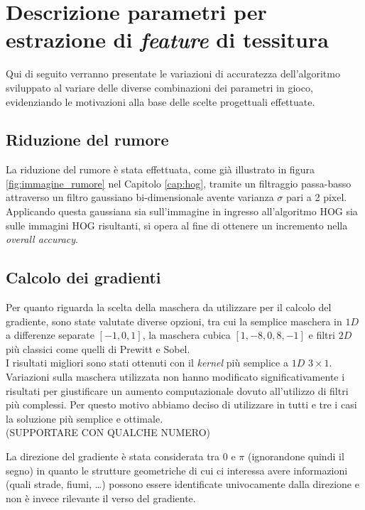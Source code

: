 %

\section{Descrizione parametri per estrazione di \emph{feature} di tessitura}
Qui di seguito verranno presentate le variazioni di accuratezza dell'algoritmo sviluppato al variare delle diverse combinazioni dei parametri in gioco, evidenziando le motivazioni alla base delle scelte progettuali effettuate.

\subsection{Riduzione del rumore}
La riduzione del rumore è stata effettuata, come già illustrato in figura \ref{fig:immagine_rumore} nel Capitolo \ref{cap:hog}, tramite un filtraggio passa-basso attraverso un filtro gaussiano bi-dimensionale avente varianza $\sigma$ pari a 2 pixel. Applicando questa gaussiana sia sull'immagine in ingresso all'algoritmo HOG sia sulle immagini HOG risultanti, si opera al fine di ottenere un incremento nella \emph{overall accuracy}.

\subsection{Calcolo dei gradienti}
Per quanto riguarda la scelta della maschera da utilizzare per il calcolo del gradiente, sono state valutate diverse opzioni, tra cui la semplice maschera in $1D$ a differenze separate $[-1, 0 ,1]$, la maschera cubica $[1,-8,0,8,-1]$ e filtri  $2D$ più classici come quelli di Prewitt e Sobel.\\
I risultati migliori sono stati ottenuti con il \emph{kernel} più semplice a $1D$ $3\times1$. Variazioni sulla maschera utilizzata non hanno modificato significativamente i risultati per giustificare un aumento computazionale dovuto all'utilizzo di filtri più complessi. Per questo motivo abbiamo deciso di utilizzare in tutti e tre i casi la soluzione più semplice e ottimale.\\ (SUPPORTARE CON QUALCHE NUMERO)

La direzione del gradiente è stata considerata tra $0$ e $\pi$ (ignorandone quindi il segno) in quanto le strutture geometriche di cui ci interessa avere informazioni (quali strade, fiumi, \ldots) possono essere identificate univocamente dalla direzione e non è invece rilevante il verso del gradiente.

